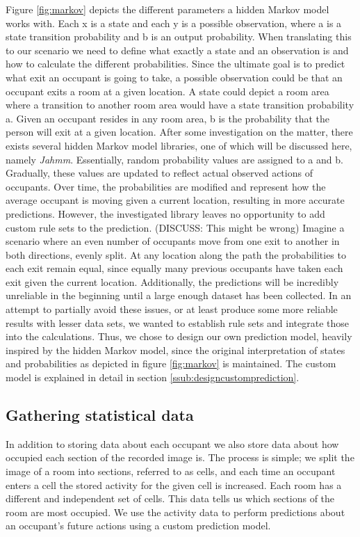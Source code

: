 Figure \ref{fig:markov} depicts the different parameters a hidden Markov model works with. Each x is a state and each y is a possible observation, where a is a state transition probability and b is an output probability. When translating this to our scenario we need to define what exactly a state and an observation is and how to calculate the different probabilities. Since the ultimate goal is to predict what exit an occupant is going to take, a possible observation could be that an occupant exits a room at a given location. A state could depict a room area where a transition to another room area would have a state transition probability a. Given an occupant resides in any room area, b is the probability that the person will exit at a given location. After some investigation on the matter, there exists several hidden Markov model libraries, one of which will be discussed here, namely \emph{Jahmm}. Essentially, random probability values are assigned to a and b. Gradually, these values are updated to reflect actual observed actions of occupants. Over time, the probabilities are modified and represent how the average occupant is moving given a current location, resulting in more accurate predictions. However, the investigated library leaves no opportunity to add custom rule sets to the prediction. (DISCUSS: This might be wrong) Imagine a scenario where an even number of occupants move from one exit to another in both directions, evenly split. At any location along the path the probabilities to each exit remain equal, since equally many previous occupants have taken each exit given the current location. Additionally, the predictions will be incredibly unreliable in the beginning until a large enough dataset has been collected. In an attempt to partially avoid these issues, or at least produce some more reliable results with lesser data sets, we wanted to establish rule sets and integrate those into the calculations. Thus, we chose to design our own prediction model, heavily inspired by the hidden Markov model, since the original interpretation of states and probabilities as depicted in figure \ref{fig:markov} is maintained. The custom model is explained in detail in section \ref{ssub:designcustomprediction}. \\

\subsection{Gathering statistical data}
\label{ssub:statisticaldata}
In addition to storing data about each occupant we also store data about how occupied each section of the recorded image is. The process is simple; we split the image of a room into sections, referred to as cells, and each time an occupant enters a cell the stored activity for the given cell is increased. Each room has a different and independent set of cells. This data tells us which sections of the room are most occupied. We use the activity data to perform predictions about an occupant's future actions using a custom prediction model.

